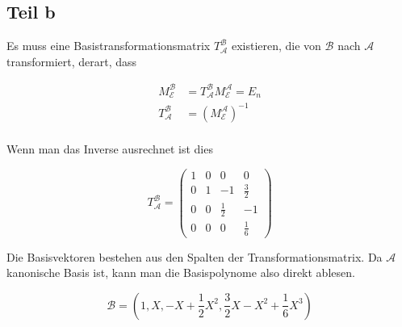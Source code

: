 \documentclass[a4paper,german,12pt,smallheadings]{scrartcl}
\begin{document}
\subsection*{Teil b}

Es muss eine Basistransformationsmatrix $T^{\mathcal{B}}_{\mathcal{A}}$ existieren, die von $\mathcal{B}$ nach $\mathcal{A}$ transformiert, derart, dass

\begin{align*}
  M^{\mathcal{B}}_{\mathcal{E}} &= T^{\mathcal{B}}_{\mathcal{A}} M^{\mathcal{A}}_{\mathcal{E}} = E_n \\
  T^{\mathcal{B}}_{\mathcal{A}} &= \left(M^{\mathcal{A}}_{\mathcal{E}}\right)^{-1} \\
\end{align*}

Wenn man das Inverse ausrechnet ist dies

\begin{equation}
  T^{\mathcal{B}}_{\mathcal{A}} = \begin{pmatrix} 1 & 0 & 0 & 0 \\  0 & 1 & -1 & \frac{3}{2} \\ 0 & 0 & \frac{1}{2} & -1 \\ 0 & 0 & 0 & \frac{1}{6} \end{pmatrix}
\end{equation}

Die Basisvektoren bestehen aus den Spalten der Transformationsmatrix. Da
$\mathcal{A}$ kanonische Basis ist, kann man die Basispolynome also direkt
ablesen. 

\begin{equation}
  \mathcal{B} = \left(1, X, -X+\frac{1}{2}X^2, \frac{3}{2}X-X^2+\frac{1}{6}X^3\right)
\end{equation}
\end{document}

